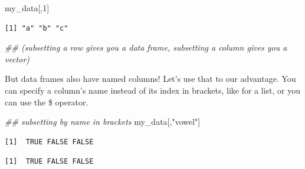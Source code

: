 \documentclass[
  letterpaper,
  DIV=11,
  numbers=noendperiod]{scrreprt}
\newenvironment{Shaded}{\begin{snugshade}}{\end{snugshade}}
\newcommand{\DecValTok}[1]{\textcolor[rgb]{0.68,0.00,0.00}{#1}}
\newcommand{\DocumentationTok}[1]{\textcolor[rgb]{0.37,0.37,0.37}{\textit{#1}}}
\newcommand{\FunctionTok}[1]{\textcolor[rgb]{0.28,0.35,0.67}{#1}}
\newcommand{\NormalTok}[1]{\textcolor[rgb]{0.00,0.23,0.31}{#1}}
\newcommand{\SpecialCharTok}[1]{\textcolor[rgb]{0.37,0.37,0.37}{#1}}
\newcommand{\StringTok}[1]{\textcolor[rgb]{0.13,0.47,0.30}{#1}}
\begin{document}
\begin{Shaded}
\begin{Highlighting}[]
\NormalTok{my\_data[,}\DecValTok{1}\NormalTok{]}
\end{Highlighting}
\end{Shaded}

\begin{verbatim}
[1] "a" "b" "c"
\end{verbatim}

\begin{Shaded}
\begin{Highlighting}[]
\DocumentationTok{\#\# (subsetting a row gives you a data frame, subsetting a column gives you a vector)}
\end{Highlighting}
\end{Shaded}

But data frames also have named columns! Let's use that to our
advantage. You can specify a column's name instead of its index in
brackets, like for a list, or you can use the \$ operator.

\begin{Shaded}
\begin{Highlighting}[]
\DocumentationTok{\#\# subsetting by name in brackets}
\NormalTok{my\_data[,}\StringTok{"vowel"}\NormalTok{]}
\end{Highlighting}
\end{Shaded}

\begin{verbatim}
[1]  TRUE FALSE FALSE
\end{verbatim}

\begin{Shaded}
\end{Shaded}

\begin{verbatim}
[1]  TRUE FALSE FALSE
\end{verbatim}

\begin{Shaded}
\end{Shaded}
\end{document}
